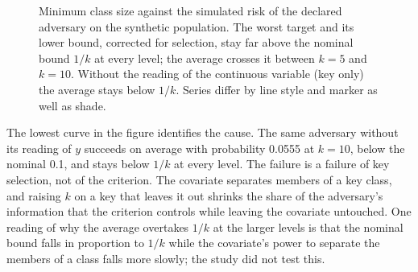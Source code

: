 \begin{figure}[ht]
\centering
{}
\caption{Minimum class size against the simulated risk of the declared adversary on
the synthetic population. The worst target and its lower bound, corrected for
selection, stay far above the nominal bound $1/k$ at every level; the average
crosses it between $k = 5$ and $k = 10$. Without the reading of the continuous
variable (key only) the average stays below $1/k$. Series differ by line style and
marker as well as shade.}
\label{c11:fig-kanon}
\end{figure}

The lowest curve in the figure identifies the cause. The same adversary without its
reading of $y$ succeeds on average with probability 0.0555 at $k = 10$, below the
nominal 0.1, and stays below $1/k$ at every level.
The failure is a failure of key selection, not of the criterion. The covariate
separates members of a key class, and raising $k$ on a key that leaves it out
shrinks the share of the adversary's information that the criterion controls while
leaving the covariate untouched. One reading of why the average overtakes $1/k$ at
the larger levels is that the nominal bound falls in proportion to $1/k$ while the
covariate's power to separate the members of a class falls more slowly; the study
did not test this.

